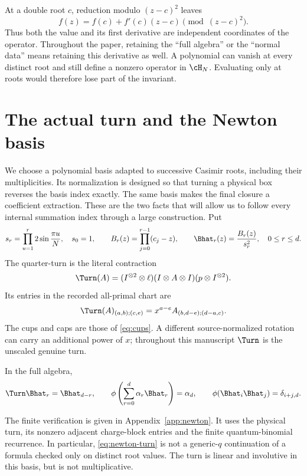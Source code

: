 At a double root $c$, reduction modulo $(z-c)^2$ leaves
\[
 f(z)=f(c)+f'(c)(z-c)\pmod{(z-c)^2}.
\]
Thus both the value and its first derivative are independent coordinates of the operator. Throughout the paper, retaining the ``full algebra'' or the ``normal data'' means retaining this derivative as well. A polynomial can vanish at every distinct root and still define a nonzero operator in $\cH_N$. Evaluating only at roots would therefore lose part of the invariant.

\section{The actual turn and the Newton basis}

We choose a polynomial basis adapted to successive Casimir roots, including their multiplicities. Its normalization is designed so that turning a physical box reverses the basis index exactly. The same basis makes the final closure a coefficient extraction. These are the two facts that will allow us to follow every internal summation index through a large construction.
Put
\begin{equation}\label{eq:newton-basis}
 s_r=\prod_{u=1}^{r}2\sin\frac{\pi u}{N},\quad s_0=1,\qquad
 B_r(z)=\prod_{j=0}^{r-1}(c_j-z),\qquad
 \Bhat_r(z)=\frac{B_r(z)}{s_r^2},\quad 0\le r\le d.
\end{equation}
The quarter-turn is the literal contraction
\[
 \Turn(A)=(I^{\otimes2}\otimes\ell)(I\otimes A\otimes I)
 (p\otimes I^{\otimes2}).
\]
Its entries in the recorded all-primal chart are
\[
 \Turn(A)_{(a,b);(c,e)}=x^{a-e}A_{(b,d-e);(d-a,c)}.
\]
The cups and caps are those of \eqref{eq:cups}. A different source-normalized rotation can carry an additional power of $x$; throughout this manuscript $\Turn$ is the unscaled genuine turn.

\begin{proposition}\label{prop:newton-turn}
In the full algebra,
\begin{equation}\label{eq:newton-turn}
 \Turn\Bhat_r=\Bhat_{d-r},\qquad
 \phi\left(\sum_{r=0}^{d}\alpha_r\Bhat_r\right)=\alpha_d,
 \qquad
 \phi(\Bhat_i\Bhat_j)=\delta_{i+j,d}.
\end{equation}
\end{proposition}
The finite verification is given in Appendix~\ref{app:newton}. It uses the physical turn, its nonzero adjacent charge-block entries and the finite quantum-binomial recurrence. In particular, \eqref{eq:newton-turn} is not a generic-$q$ continuation of a formula checked only on distinct root values. The turn is linear and involutive in this basis, but is not multiplicative.

